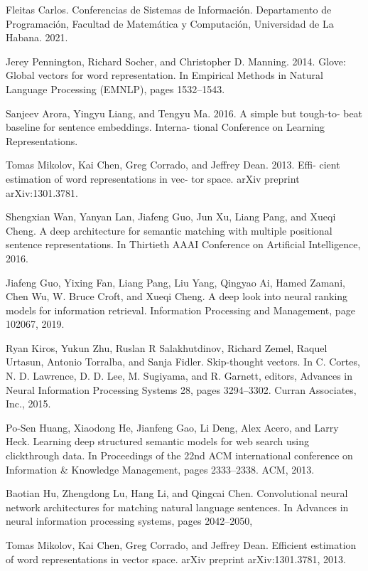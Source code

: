 \documentclass{llncs}
\begin{document}
%
%
\begin{thebibliography}{}
%
 Fleitas Carlos. Conferencias de Sistemas de Información. Departamento de Programación, Facultad de Matemática y Computación, Universidad de La Habana. 2021.

 Jerey Pennington, Richard Socher, and Christopher D. Manning. 2014. Glove: Global vectors for word representation. In Empirical Methods in Natural Language Processing (EMNLP), pages 1532–1543.

 Sanjeev Arora, Yingyu Liang, and Tengyu Ma. 2016. A simple but tough-to- beat baseline for sentence embeddings. Interna- tional Conference on Learning Representations.

 Tomas Mikolov, Kai Chen, Greg Corrado, and Jeffrey Dean. 2013. Effi- cient estimation of word representations in vec- tor space. arXiv preprint arXiv:1301.3781.

Shengxian Wan, Yanyan Lan, Jiafeng Guo, Jun Xu, Liang Pang, and Xueqi Cheng. A deep architecture for semantic matching with multiple positional sentence representations. In Thirtieth AAAI Conference on Artificial Intelligence, 2016.

 Jiafeng Guo, Yixing Fan, Liang Pang, Liu Yang, Qingyao Ai, Hamed Zamani, Chen Wu, W. Bruce Croft, and Xueqi Cheng. A deep look into neural ranking models for information retrieval. Information Processing and Management, page 102067, 2019.

 Ryan Kiros, Yukun Zhu, Ruslan R Salakhutdinov, Richard Zemel, Raquel Urtasun, Antonio Torralba, and Sanja Fidler. Skip-thought vectors. In C. Cortes, N. D. Lawrence, D. D. Lee, M. Sugiyama, and R. Garnett, editors, Advances in Neural Information Processing Systems 28, pages 3294–3302. Curran Associates, Inc., 2015.

 Po-Sen Huang, Xiaodong He, Jianfeng Gao, Li Deng, Alex Acero, and Larry Heck. Learning deep structured semantic models for web search using clickthrough data. In Proceedings of the 22nd ACM international conference on Information \& Knowledge Management, pages 2333–2338. ACM, 2013.

 Baotian Hu, Zhengdong Lu, Hang Li, and Qingcai Chen. Convolutional neural network architectures for matching natural language sentences. In Advances in neural information processing systems, pages 2042–2050,


  Tomas Mikolov, Kai Chen, Greg Corrado, and Jeffrey Dean. Efficient estimation of word representations in vector space. arXiv preprint arXiv:1301.3781, 2013.


\end{thebibliography}
\end{document}
